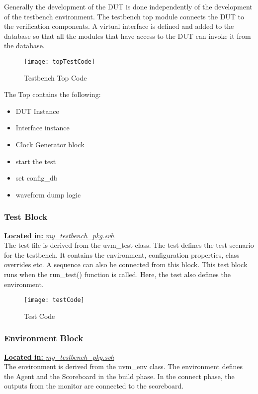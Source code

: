 \documentclass[a4paper,11pt]{article}
\begin{document}
Generally the development of the DUT is done independently of the development of the testbench environment. The testbench top module connects the DUT to the verification components. A virtual interface is defined and added to the database so that all the modules that have access to the DUT can invoke it from the database.

\begin{figure}[ht]
\centering
\texttt{[image: topTestCode]}
\caption{Testbench Top Code}
\end{figure}

The Top contains the following:

\begin{itemize}[noitemsep]
\item DUT Instance
\item Interface instance
\item Clock Generator block
\item start the test
\item set config\_db
\item waveform dump logic
\end{itemize}
 

\subsubsection{Test Block}
\underline{\textbf{Located in:} \textit{my\_testbench\_pkg.svh}}\\

The test file is derived from the uvm\_test class. The test defines the test scenario for the testbench. It contains the environment, configuration properties, class overrides etc. A sequence can also be connected from this block. This test block runs when the run\_test() function is called. Here, the test also defines the environment.
\begin{figure}[ht]
\centering
\texttt{[image: testCode]}
\caption{Test Code}
\end{figure}


\FloatBarrier
\subsubsection{Environment Block}
\underline{\textbf{Located in:} \textit{my\_testbench\_pkg.svh}}\\

The environment is derived from the uvm\_env class. The environment defines the Agent and the Scoreboard in the build phase. In the connect phase, the outputs from the monitor are connected to the scoreboard.
\end{document}
